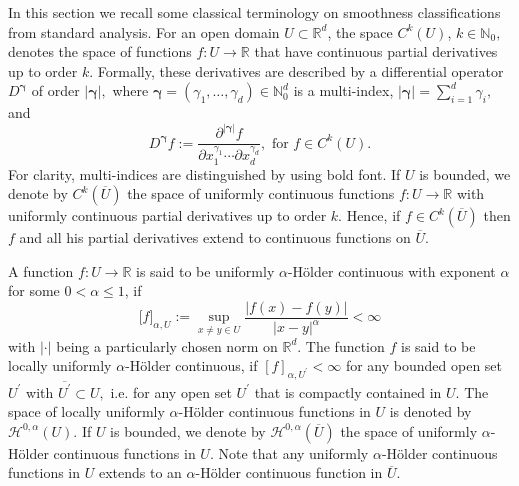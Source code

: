 \documentclass[a4paper,11pt]{amsart}
\theoremstyle{plain}
\theoremstyle{remark}
\begin{document}
In this section we recall some classical terminology on smoothness
classifications from standard analysis. For an open domain $U\subset
\mathbb{R}^{d}$, the space $C^{k}(U)$, $k\in\mathbb{N}_{0},$ denotes the space
of functions $f:U\rightarrow\mathbb{R}$ that have continuous partial
derivatives up to order $k$. Formally, these derivatives are described by a
differential operator $D^{{\boldsymbol{\gamma}}}$ of order $\left\vert
{\boldsymbol{\gamma}}\right\vert ,$ where ${\boldsymbol{\gamma}}=(\gamma
_{1},\dots,\gamma_{d})\in\mathbb{N}_{0}^{d}$ is a multi-index, $\left\vert
{\boldsymbol{\gamma}}\right\vert =\sum_{i=1}^{d}\gamma_{i},$ and
\[
D^{{\boldsymbol{\gamma}}}f:=\frac{\partial^{|{\boldsymbol{\gamma}}|}%
f}{\partial x_{1}^{\gamma_{1}}\cdots\partial x_{d}^{\gamma_{d}}},\text{ \ for
\ \ }f\in C^{k}(U).
\]
For clarity, multi-indices are distinguished by using bold font. If $U$ is bounded, we denote by $C^{k}(\overline{U})$ the space of
uniformly continuous functions $f:U\rightarrow\mathbb{R}$ with uniformly
continuous partial derivatives up to order $k$. Hence, if $f\in C^{k}%
(\overline{U})$ then $f$ and all his partial derivatives extend to continuous
functions on $\overline{U}.$

A function $f:U\rightarrow\mathbb{R}$ is said to be uniformly
$\alpha$-H\"{o}lder continuous with exponent $\alpha$ for some $0<\alpha\leq
1$, if
\[
\lbrack f]_{\alpha,U}:=\sup_{x\neq y\in U}\frac{|f(x)-f(y)|}{|x-y|^{\alpha}%
}<\infty
\]
with $\left\vert \cdot\right\vert $ being a particularly chosen norm on
$\mathbb{R}^{d}.$ The function $f$ is said to be locally uniformly $\alpha
$-H\"{o}lder continuous, if $[f]_{\alpha,U^{\prime}}<\infty$ for any bounded
open set $U^{\prime}$ with $\overline{U^{\prime}}\subset U,$ i.e. for any open
set $U^{\prime}$ that is compactly contained in $U.$ The space of locally
uniformly $\alpha$-H\"{o}lder continuous functions in $U$ is denoted by
$\mathcal{H}^{0,\alpha}(U).$ If $U$ is bounded, we denote by $\mathcal{H}%
^{0,\alpha}(\overline{U})$ the space of uniformly $\alpha$-H\"{o}lder
continuous functions in $U.$ Note that any uniformly $\alpha$-H\"{o}lder
continuous functions in $U$ extends to an $\alpha$-H\"{o}lder continuous
function in $\overline{U}.$
\end{document}
